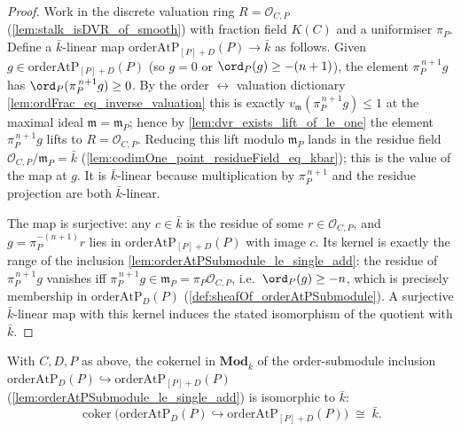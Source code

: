 \begin{proof}
        \leanok
  Work in the discrete valuation ring \(R = \mathcal O_{C,P}\)
  (\cref{lem:stalk_isDVR_of_smooth}) with fraction field \(K(C)\) and a
  uniformiser \(\pi_P\). Define a \(\bar k\)-linear map
  \(\mathrm{orderAtP}_{[P]+D}(P) \to \bar k\) as follows. Given
  \(g \in \mathrm{orderAtP}_{[P]+D}(P)\) (so \(g = 0\) or
  \(\ord_P(g) \ge -(n+1)\)), the element \(\pi_P^{\,n+1} g\) has
  \(\ord_P(\pi_P^{\,n+1} g) \ge 0\). By the order \(\leftrightarrow\) valuation
  dictionary \cref{lem:ordFrac_eq_inverse_valuation} this is exactly
  \(v_{\mathfrak m}(\pi_P^{\,n+1} g) \le 1\) at the maximal ideal
  \(\mathfrak m = \mathfrak m_P\); hence by
  \cref{lem:dvr_exists_lift_of_le_one} the element \(\pi_P^{\,n+1} g\) lifts to
  \(R = \mathcal O_{C,P}\). Reducing this lift modulo \(\mathfrak m_P\) lands in
  the residue field \(\mathcal O_{C,P}/\mathfrak m_P = \bar k\)
  (\cref{lem:codimOne_point_residueField_eq_kbar}); this is the value of the
  map at \(g\). It is \(\bar k\)-linear because multiplication by
  \(\pi_P^{\,n+1}\) and the residue projection are both \(\bar k\)-linear.

  The map is surjective: any \(c \in \bar k\) is the residue of some
  \(r \in \mathcal O_{C,P}\), and \(g = \pi_P^{-(n+1)} r\) lies in
  \(\mathrm{orderAtP}_{[P]+D}(P)\) with image \(c\). Its kernel is exactly the
  range of the inclusion \cref{lem:orderAtPSubmodule_le_single_add}: the residue
  of \(\pi_P^{\,n+1} g\) vanishes iff \(\pi_P^{\,n+1} g \in \mathfrak m_P =
  \pi_P\mathcal O_{C,P}\), i.e.\ \(\ord_P(g) \ge -n\), which is precisely
  membership in \(\mathrm{orderAtP}_D(P)\) (\cref{def:sheafOf_orderAtPSubmodule}).
  A surjective \(\bar k\)-linear map with this kernel induces the stated
  isomorphism of the quotient with \(\bar k\).
\end{proof}

\begin{lemma}
  \label{lem:orderAtP_quotient_iso_kbar}
  With \(C, D, P\) as above, the cokernel in \(\mathbf{Mod}_{\bar k}\) of the
  order-submodule inclusion
  \(\mathrm{orderAtP}_D(P) \hookrightarrow \mathrm{orderAtP}_{[P]+D}(P)\)
  (\cref{lem:orderAtPSubmodule_le_single_add}) is isomorphic to \(\bar k\):
  \[
    \operatorname{coker}\!\bigl(
      \mathrm{orderAtP}_D(P) \hookrightarrow
      \mathrm{orderAtP}_{[P]+D}(P)\bigr)
    \;\cong\; \bar k.
  \]
\end{lemma}

